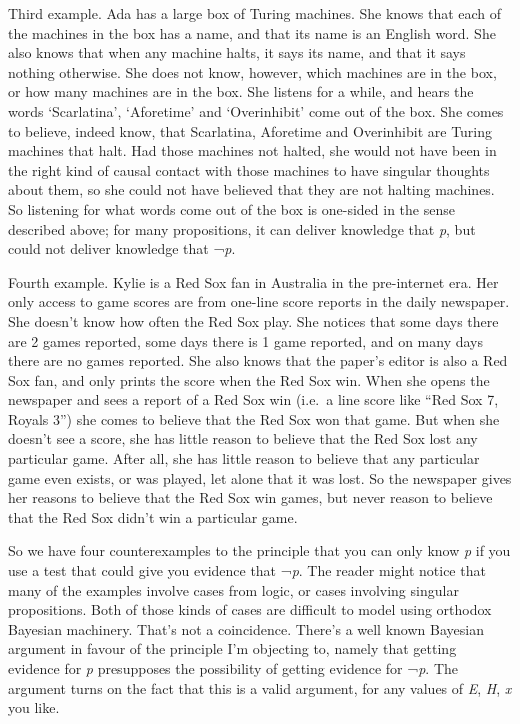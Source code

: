 \documentclass[
  10pt,
  letterpaper,
  twoside]{scrbook}
\begin{document}
Third example. {Ada} has a large box of Turing machines. She knows that
each of the machines in the box has a name, and that its name is an
English word. She also knows that when any machine halts, it says its
name, and that it says nothing otherwise. She does not know, however,
which machines are in the box, or how many machines are in the box. She
listens for a while, and hears the words `Scarlatina', `Aforetime' and
`Overinhibit' come out of the box. She comes to believe, indeed know,
that Scarlatina, Aforetime and Overinhibit are Turing machines that
halt. Had those machines not halted, she would not have been in the
right kind of causal contact with those machines to have singular
thoughts about them, so she could not have believed that they are not
halting machines. So listening for what words come out of the box is
one-sided in the sense described above; for many propositions, it can
deliver knowledge that \emph{p}, but could not deliver knowledge that
¬\emph{p}.

Fourth example. {Kylie} is a Red Sox fan in Australia in the
pre-internet era. Her only access to game scores are from one-line score
reports in the daily newspaper. She doesn't know how often the Red Sox
play. She notices that some days there are 2 games reported, some days
there is 1 game reported, and on many days there are no games reported.
She also knows that the paper's editor is also a Red Sox fan, and only
prints the score when the Red Sox win. When she opens the newspaper and
sees a report of a Red Sox win (i.e.~a line score like ``Red Sox 7,
Royals 3'') she comes to believe that the Red Sox won that game. But
when she doesn't see a score, she has little reason to believe that the
Red Sox lost any particular game. After all, she has little reason to
believe that any particular game even exists, or was played, let alone
that it was lost. So the newspaper gives her reasons to believe that the
Red Sox win games, but never reason to believe that the Red Sox didn't
win a particular game.

So we have four counterexamples to the principle that you can only know
\emph{p} if you use a test that could give you evidence that ¬\emph{p}.
The reader might notice that many of the examples involve cases from
logic, or cases involving singular propositions. Both of those kinds of
cases are difficult to model using orthodox Bayesian machinery. That's
not a coincidence. There's a well known Bayesian argument in favour of
the principle I'm objecting to, namely that getting evidence for
\emph{p} presupposes the possibility of getting evidence for ¬\emph{p}.
The argument turns on the fact that this is a valid argument, for any
values of \emph{E}, \emph{H}, \emph{x} you like.
\end{document}

